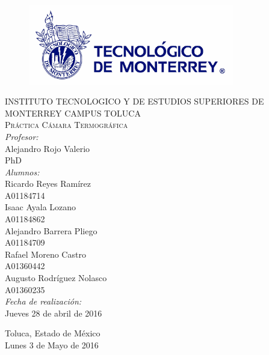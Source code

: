 \begin{titlepage}
\begin{center}
\begin{figure}[!htbp]
\centering
\includegraphics[width=90mm]{./img/logo_itesm.jpg}
\end{figure}


\textsc{ INSTITUTO TECNOLOGICO Y DE ESTUDIOS SUPERIORES DE MONTERREY
CAMPUS TOLUCA}\\[1.5cm]

\textsc{ Pr\'actica C\'amara Termogr\'afica }\\[0.5cm]


\emph{Profesor:}\\
 Alejandro Rojo Valerio\\
 PhD\\
 \medskip
\emph{Alumnos:} \\
Ricardo Reyes Ram\'irez\\A01184714\\
Isaac Ayala Lozano\\A01184862\\
Alejandro Barrera Pliego\\A01184709\\
Rafael Moreno Castro\\A01360442\\
Augusto Rodr\'iguez Nolasco\\A01360235\\

 \medskip
\emph{Fecha de realizaci\'on:}\\
Jueves 28 de abril de 2016\\
\vfill


{\large
Toluca, Estado de M\'exico\\
Lunes 3 de Mayo de 2016
}

\end{center}
\end{titlepage}
